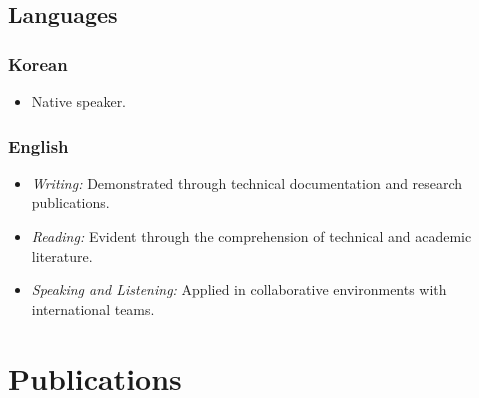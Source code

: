 \documentclass[11pt]{article}
\begin{document}
\subsection{Languages}
\subsubsection{Korean}
\begin{itemize}
    \item[\checkmark] Native speaker.
\end{itemize}
\subsubsection{English}
\begin{itemize}
    \item[\checkmark] \textit{Writing:} Demonstrated through technical documentation and research publications.
    \item[\checkmark] \textit{Reading:} Evident through the comprehension of technical and academic literature.
    \item[\checkmark] \textit{Speaking and Listening:} Applied in collaborative environments with international teams.
\end{itemize}

\section{Publications}
\end{document}
